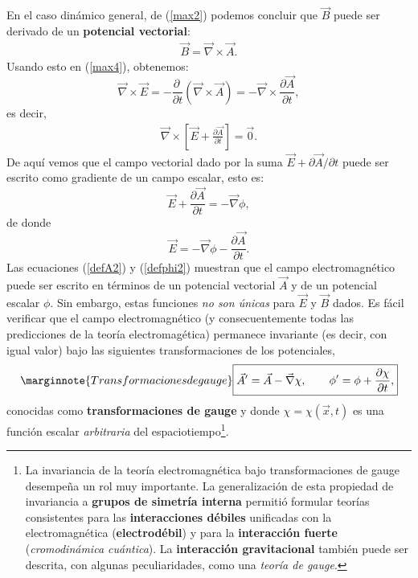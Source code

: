 En el caso dinámico general, de (\ref{max2}) podemos concluir que $\vec{B}$
puede ser derivado de un \textbf{potencial vectorial}:
\begin{eqnarray}\label{defA2}
\boxed{\vec{B}=\vec{\nabla}\times \vec{A}.}
\end{eqnarray}
Usando esto en (\ref{max4}), obtenemos:
\begin{equation}
\vec{\nabla}\times \vec{E} = -  \frac{\partial\ }{\partial
t}(\vec{\nabla}\times\vec{A}) = -\vec{\nabla}\times
\frac{\partial\vec{A}}{\partial t},
\end{equation}
es decir,
\begin{eqnarray}
\vec{\nabla}\times \left[ \vec{E} + \frac{\partial \vec{A}}{\partial t} \right]
= \vec{0}.
\end{eqnarray}
De aquí vemos que el campo vectorial dado por la suma $\vec{E} + {\partial
\vec{A}}/{\partial t}$ puede ser escrito como gradiente de un campo escalar, esto es:
\begin{equation}
\vec{E} + \frac{\partial \vec{A}}{\partial t}= - \vec{\nabla}\phi ,
\end{equation}
de donde
\begin{equation}\label{defphi2}
\boxed{\vec{E} =   - \vec{\nabla}\phi - \frac{\partial \vec{A}}{\partial t}.}
\end{equation}
Las ecuaciones (\ref{defA2}) y (\ref{defphi2}) muestran que el campo
electromagn\'etico puede ser escrito en t\'erminos de un potencial vectorial
$\vec{A}$ y de un potencial escalar $\phi$. Sin embargo, estas funciones
\textit{no son únicas} para $\vec{E}$ y $\vec{B}$ dados. Es fácil verificar
que el campo electromagn\'etico (y consecuentemente todas las predicciones de la
teoría electromag\'etica) permanece invariante (es decir, con igual valor) bajo las
siguientes transformaciones de los potenciales,
\begin{equation}\marginnote{Transformaciones de gauge}\label{tgg}
\boxed{{\vec{A}}' = \vec{A} - \vec{\nabla}{\chi}, \qquad \phi' =\phi +
\frac{\partial \chi}{\partial t},}
\end{equation}
conocidas como \textbf{transformaciones de gauge} y donde $\chi=\chi(\vec{x},t)$
es una función escalar \textit{arbitraria} del espaciotiempo\footnote{La invariancia
de la teoría electromagn\'etica bajo transformaciones de gauge
desempeña un rol muy importante. La generalización de esta propiedad de
invariancia a \textbf{grupos de simetría interna} permitió formular
teorías consistentes para las \textbf{interacciones d\'ebiles} unificadas con la electromagn\'etica (\textbf{electrod\'ebil}) y para la \textbf{interacción fuerte}
(\textit{cromodinámica cuántica}). La \textbf{interacción gravitacional} tambi\'en puede ser descrita, con algunas peculiaridades, como una \textit{teoría de gauge}.}.

